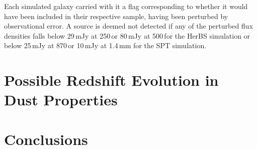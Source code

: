 Each simulated galaxy carried with it a flag corresponding to whether it would have been included in their respective sample, having been perturbed by observational error. A source is deemed not detected if any of the perturbed flux densities falls below 29\,mJy at 250\,\micron or 80\,mJy at 500\,\micron for the HerBS simulation or below 25\,mJy at 870\,\micron or 10\,mJy at 1.4\,mm for the SPT simulation.

\section{Possible Redshift Evolution in Dust Properties}
\label{sec:redshift_evolution}

\section{Conclusions}